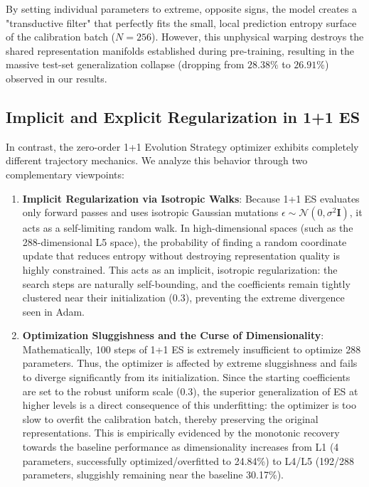 \documentclass{article}
\theoremstyle{plain}
\theoremstyle{definition}
\theoremstyle{remark}
\begin{document}
By setting individual parameters to extreme, opposite signs, the model creates a "transductive filter" that perfectly fits the small, local prediction entropy surface of the calibration batch ($N=256$). However, this unphysical warping destroys the shared representation manifolds established during pre-training, resulting in the massive test-set generalization collapse (dropping from $28.38\%$ to $26.91\%$) observed in our results.

\subsection{Implicit and Explicit Regularization in 1+1 ES}
In contrast, the zero-order 1+1 Evolution Strategy optimizer exhibits completely different trajectory mechanics. We analyze this behavior through two complementary viewpoints:
\begin{enumerate}
    \item \textbf{Implicit Regularization via Isotropic Walks}: Because 1+1 ES evaluates only forward passes and uses isotropic Gaussian mutations $\epsilon \sim \mathcal{N}(0, \sigma^2 \mathbf{I})$, it acts as a self-limiting random walk. In high-dimensional spaces (such as the 288-dimensional L5 space), the probability of finding a random coordinate update that reduces entropy without destroying representation quality is highly constrained. This acts as an implicit, isotropic regularization: the search steps are naturally self-bounding, and the coefficients remain tightly clustered near their initialization ($0.3$), preventing the extreme divergence seen in Adam.
    \item \textbf{Optimization Sluggishness and the Curse of Dimensionality}: Mathematically, 100 steps of 1+1 ES is extremely insufficient to optimize 288 parameters. Thus, the optimizer is affected by extreme sluggishness and fails to diverge significantly from its initialization. Since the starting coefficients are set to the robust uniform scale ($0.3$), the superior generalization of ES at higher levels is a direct consequence of this underfitting: the optimizer is too slow to overfit the calibration batch, thereby preserving the original representations. This is empirically evidenced by the monotonic recovery towards the baseline performance as dimensionality increases from L1 (4 parameters, successfully optimized/overfitted to 24.84\%) to L4/L5 (192/288 parameters, sluggishly remaining near the baseline 30.17\%).
\end{enumerate}
\end{document}
